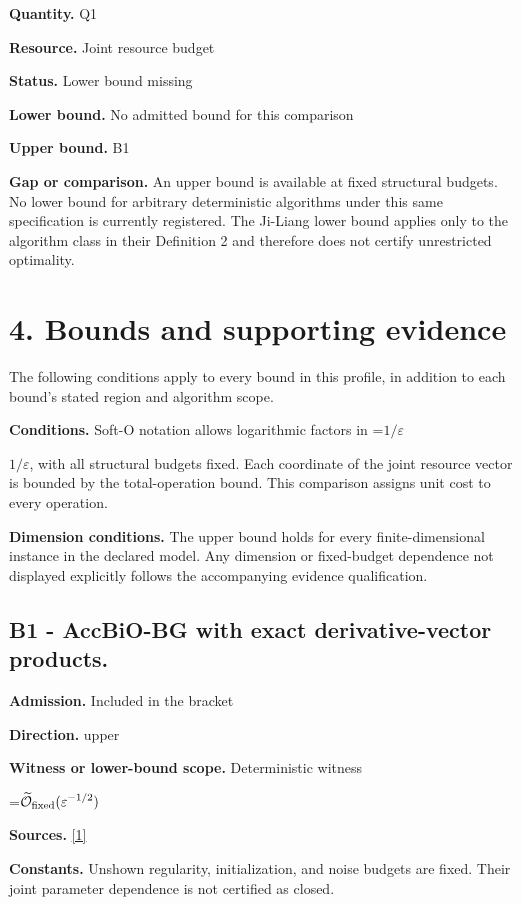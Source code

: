 \documentclass[10pt,a4paper]{article}
\newcommand{\AtlasMath}[1]{\par\begingroup\centering\setbox0=\hbox{$\displaystyle #1$}\ifdim\wd0>1.4\linewidth\typeout{ATLAS WIDE FORMULA: \the\wd0}\fi\ifdim\wd0>\linewidth\resizebox{\linewidth}{!}{\box0}\else\box0\fi\par\endgroup}
\newcommand{\AtlasInlineMath}[1]{\begingroup\setbox0=\hbox{$#1$}\ifdim\wd0>.4\linewidth\endgroup\AtlasMath{#1}\else\endgroup$#1$\fi}
\begin{document}
\textbf{Quantity.} Q1

\textbf{Resource.} Joint resource budget

\textbf{Status.} Lower bound missing

\textbf{Lower bound.} No admitted bound for this comparison

\textbf{Upper bound.} B1

\textbf{Gap or comparison.} An upper bound is available at fixed structural budgets. No lower bound for arbitrary deterministic algorithms under this same specification is currently registered. The Ji-Liang lower bound applies only to the algorithm class in their Definition 2 and therefore does not certify unrestricted optimality.

\section{4. Bounds and supporting evidence}
The following conditions apply to every bound in this profile, in addition to each bound's stated region and algorithm scope.

\textbf{Conditions.} Soft-O notation allows logarithmic factors in \AtlasInlineMath{1/\varepsilon}, with all structural budgets fixed. Each coordinate of the joint resource vector is bounded by the total-operation bound. This comparison assigns unit cost to every operation.

\textbf{Dimension conditions.} The upper bound holds for every finite-dimensional instance in the declared model. Any dimension or fixed-budget dependence not displayed explicitly follows the accompanying evidence qualification.

\subsection{B1 - AccBiO-BG with exact derivative-vector products.}
\textbf{Admission.} Included in the bracket

\textbf{Direction.} upper

\textbf{Witness or lower-bound scope.} Deterministic witness

\AtlasMath{\widetilde{\mathcal{O}}_{\rm fixed}(\varepsilon^{-1/2})}
\textbf{Sources.} \href{https://www.jmlr.org/papers/volume24/21-0949/21-0949.pdf}{[1]}

\textbf{Constants.} Unshown regularity, initialization, and noise budgets are fixed. Their joint parameter dependence is not certified as closed.
\end{document}
